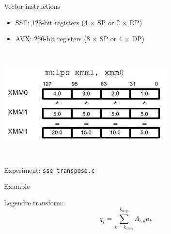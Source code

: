\documentclass[sans,mathserif]{beamer}
\begin{document}
\begin{frame}{Vector instructions}
  \begin{itemize}
  \item SSE: 128-bit registers (4 $\times$ SP or 2 $\times$ DP)
  \item AVX: 256-bit registers (8 $\times$ SP or 4 $\times$ DP)
  \end{itemize}

~

\includegraphics[width=.6\textwidth]{sse.jpg} 

~

Experiment: {\tt sse\_transpose.c}
\end{frame}

\begin{frame}{Example}

Legendre transform:
\[
q_{i} = \sum_{k = k_\mathrm{start}}^{k_\mathrm{stop}} \Lambda_{i,k} a_{k}
\]


\end{frame}
\end{document}
